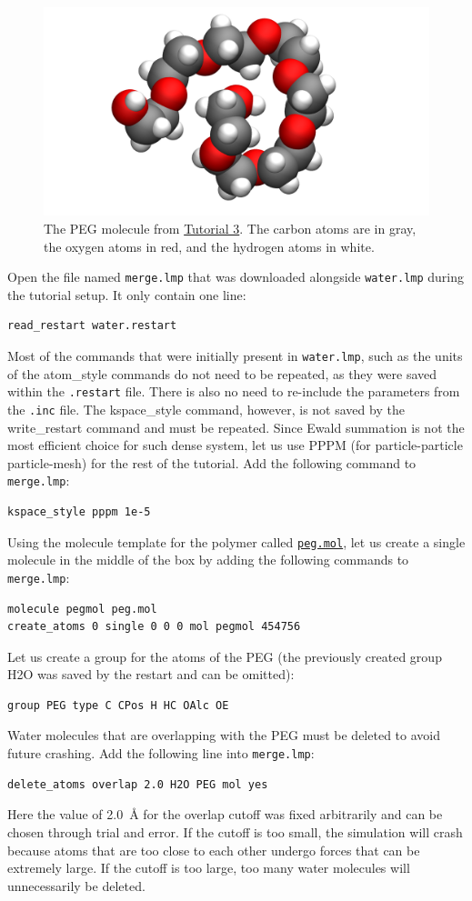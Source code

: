 \documentclass[9pt,tutorial]{livecoms}
\newcommand{\lmpcmd}[1]{\colorbox{listing}{\textcolor{command}{\small{#1}}}} %
\newcommand{\flecmd}[1]{\textcolor{command}{\texttt{#1}}} %
\newcommand{\dwlcmd}[1]{\textcolor{download}{\texttt{#1}}} %
\newcommand{\filepath}{https://raw.githubusercontent.com/lammpstutorials/lammpstutorials-article/main/files/}
\begin{document}
\begin{figure}
\centering
\includegraphics[width=0.8\linewidth]{PEG-in-vacuum}
\caption{The PEG molecule from \hyperref[all-atom-label]{Tutorial 3}.
The carbon atoms are in gray, the oxygen atoms in red, and the hydrogen atoms in white.}
\label{fig:PEG-in-vacuum}
\end{figure}

Open the file named \flecmd{merge.lmp} that was downloaded
alongside \flecmd{water.lmp} during the tutorial setup.  It only contain one line:
\begin{lstlisting}
read_restart water.restart
\end{lstlisting}
Most of the commands that were initially present in \flecmd{water.lmp}, such as
the \lmpcmd{units} of the \lmpcmd{atom\_style} commands do not need to be repeated,
as they were saved within the \flecmd{.restart} file.  There is also no need to
re-include the parameters from the \flecmd{.inc} file.  The \lmpcmd{kspace\_style}
command, however, is not saved by the \lmpcmd{write\_restart} command and must be
repeated.  Since Ewald summation is not the most efficient choice for such dense
system, let us use PPPM (for particle-particle particle-mesh) for the rest
of the tutorial.  Add the following command to \flecmd{merge.lmp}:
\begin{lstlisting}
kspace_style pppm 1e-5
\end{lstlisting}
Using the molecule template for the polymer called
\href{\filepath tutorial3/peg.mol}{\dwlcmd{peg.mol}},
let us create a single molecule in the middle of the box by adding the following
commands to \flecmd{merge.lmp}:
\begin{lstlisting}
molecule pegmol peg.mol
create_atoms 0 single 0 0 0 mol pegmol 454756
\end{lstlisting}
Let us create a group for the atoms of the PEG (the previously created
group H2O was saved by the restart and can be omitted):
\begin{lstlisting}
group PEG type C CPos H HC OAlc OE
\end{lstlisting}
Water molecules that are overlapping with the PEG must be deleted to avoid future
crashing.  Add the following line into \flecmd{merge.lmp}:
\begin{lstlisting}
delete_atoms overlap 2.0 H2O PEG mol yes
\end{lstlisting}
Here the value of 2.0~Å for the overlap cutoff was fixed arbitrarily and can
be chosen through trial and error.  If the cutoff is too small, the simulation will
crash because atoms that are too close to each other undergo forces
that can be extremely large.  If the cutoff is too large, too many water
molecules will unnecessarily be deleted.
\end{document}

